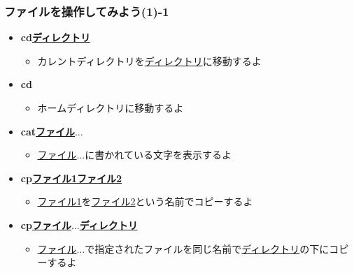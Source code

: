 \begin{frame}
    \frametitle{ファイルを操作してみよう(1)-1}
    \begin{itemize}
    \item {\bf cd\textvisiblespace\underline{ディレクトリ}}
    \begin{itemize}
        \small
        \item[] カレントディレクトリを\underline{ディレクトリ}に移動するよ
    \end{itemize}
    \item {\bf cd}
    \begin{itemize}
        \small
        \item[] ホームディレクトリに移動するよ
    \end{itemize}
    \item {\bf cat\textvisiblespace\underline{ファイル}$\ldots$}
    \begin{itemize}
        \small
        \item[] \underline{ファイル}$\ldots$に書かれている文字を表示するよ
    \end{itemize}
    \item {\bf cp\textvisiblespace\underline{ファイル1}\textvisiblespace\underline{ファイル2}}
    \begin{itemize}
        \small
        \item[] \underline{ファイル1}を\underline{ファイル2}という名前でコピーするよ
    \end{itemize}
    \item {\bf cp\textvisiblespace\underline{ファイル}$\ldots$\textvisiblespace\underline{ディレクトリ}}
    \begin{itemize}
        \small
        \item[] \underline{ファイル}$\ldots$で指定されたファイルを同じ名前で\underline{ディレクトリ}の下にコピーするよ
    \end{itemize}
    \end{itemize}
\end{frame}

